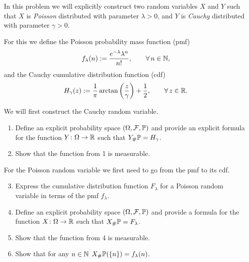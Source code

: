 \begin{problem}
In this problem we will	explicitly construct two random variables $X$ and $Y$ such that $X$ is \emph{Poisson} distributed with parameter $\lambda>0$, and $Y$ is \emph{Cauchy} distributed with parameter $\gamma>0$. 

For this we define the Poisson probability mass function (pmf)
\begin{equation}
	f_\lambda(n) := \frac{e^{-\lambda}\lambda^n}{n!},\qquad \forall\,n\in\mathbb N,
\end{equation}
and the Cauchy cumulative distribution function (cdf)
\begin{equation}
	H_\gamma(z) := \frac{1}{\pi}\arctan\left(\frac{z}{\gamma}\right) + \frac{1}{2},\qquad \forall\,z\in\mathbb R.
\end{equation}

We will first construct the Cauchy random variable.
\begin{enumerate}[label=(\alph*)]
\item Define an explicit probability space $(\Omega, \mathcal F, \mathbb P)$ and provide an explicit formula for the function $Y\colon \Omega\to\mathbb R$ such that $Y_\# \mathbb P = H_\gamma$.
\item Show that the function from 1 is measurable.
\end{enumerate}

For the Poisson random variable we first need to go from the pmf to its cdf.
\begin{enumerate}[label=(\alph*)]
\setcounter{enumi}{2}
\item Express the cumulative distribution function $F_\lambda$ for a Poisson random variable in terms of the pmf $f_\lambda$.
\item Define an explicit probability space $(\Omega, \mathcal F, \mathbb P)$ and provide a formula for the function $X\colon \Omega\to\mathbb R$ such that $X_\# \mathbb P = F_\lambda$.
\item Show that the function from 4 is measurable.
\item Show that for any $n \in \mathbb N$ $X_\# \mathbb P (\{n\}) = f_\lambda(n)$.
\end{enumerate}

\end{problem}

